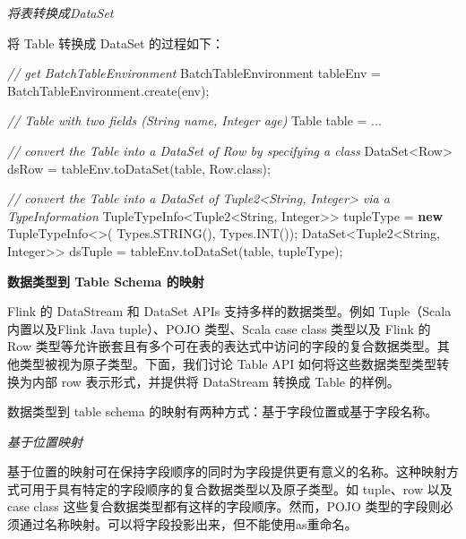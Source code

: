 \documentclass[cn,11pt,chinese]{elegantbook}
\newenvironment{Shaded}{}{}
\newcommand{\BuiltInTok}[1]{#1}
\newcommand{\CommentTok}[1]{\textcolor[rgb]{0.38,0.63,0.69}{\textit{#1}}}
\newcommand{\FunctionTok}[1]{\textcolor[rgb]{0.02,0.16,0.49}{#1}}
\newcommand{\KeywordTok}[1]{\textcolor[rgb]{0.00,0.44,0.13}{\textbf{#1}}}
\newcommand{\NormalTok}[1]{#1}
\begin{document}
\emph{将表转换成DataSet}

将 Table 转换成 DataSet 的过程如下：

\begin{Shaded}
\begin{Highlighting}[]
\CommentTok{// get BatchTableEnvironment}
\NormalTok{BatchTableEnvironment tableEnv = BatchTableEnvironment.}\FunctionTok{create}\NormalTok{(env);}

\CommentTok{// Table with two fields (String name, Integer age)}
\NormalTok{Table table = ...}

\CommentTok{// convert the Table into a DataSet of Row by specifying a class}
\NormalTok{DataSet\textless{}Row\textgreater{} dsRow = tableEnv.}\FunctionTok{toDataSet}\NormalTok{(table, Row.}\FunctionTok{class}\NormalTok{);}

\CommentTok{// convert the Table into a DataSet of Tuple2\textless{}String, Integer\textgreater{} via a TypeInformation}
\NormalTok{TupleTypeInfo\textless{}Tuple2\textless{}}\BuiltInTok{String}\NormalTok{, }\BuiltInTok{Integer}\NormalTok{\textgreater{}\textgreater{} tupleType = }\KeywordTok{new}\NormalTok{ TupleTypeInfo\textless{}\textgreater{}(}
  \BuiltInTok{Types}\NormalTok{.}\FunctionTok{STRING}\NormalTok{(),}
  \BuiltInTok{Types}\NormalTok{.}\FunctionTok{INT}\NormalTok{());}
\NormalTok{DataSet\textless{}Tuple2\textless{}}\BuiltInTok{String}\NormalTok{, }\BuiltInTok{Integer}\NormalTok{\textgreater{}\textgreater{} dsTuple = }
\NormalTok{  tableEnv.}\FunctionTok{toDataSet}\NormalTok{(table, tupleType);}
\end{Highlighting}
\end{Shaded}

\textbf{数据类型到 Table Schema 的映射}

Flink 的 DataStream 和 DataSet APIs 支持多样的数据类型。例如
Tuple（Scala 内置以及Flink Java tuple）、POJO 类型、Scala case class
类型以及 Flink 的 Row
类型等允许嵌套且有多个可在表的表达式中访问的字段的复合数据类型。其他类型被视为原子类型。下面，我们讨论
Table API 如何将这些数据类型类型转换为内部 row 表示形式，并提供将
DataStream 转换成 Table 的样例。

数据类型到 table schema 的映射有两种方式：基于字段位置或基于字段名称。

\emph{基于位置映射}

基于位置的映射可在保持字段顺序的同时为字段提供更有意义的名称。这种映射方式可用于具有特定的字段顺序的复合数据类型以及原子类型。如
tuple、row 以及 case class
这些复合数据类型都有这样的字段顺序。然而，POJO
类型的字段则必须通过名称映射。可以将字段投影出来，但不能使用as重命名。
\end{document}
